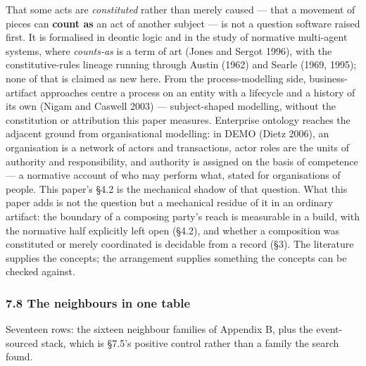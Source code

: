 \documentclass[
]{article}
\newcounter{none} %
\begin{document}
That some acts are \emph{constituted} rather than merely caused --- that
a movement of pieces can \textbf{count as} an act of another subject ---
is not a question software raised first. It is formalised in deontic
logic and in the study of normative multi-agent systems, where
\emph{counts-as} is a term of art (Jones and Sergot 1996), with the
constitutive-rules lineage running through Austin (1962) and Searle
(1969, 1995); none of that is claimed as new here. From the
process-modelling side, business-artifact approaches centre a process on
an entity with a lifecycle and a history of its own (Nigam and Caswell
2003) --- subject-shaped modelling, without the constitution or
attribution this paper measures. Enterprise ontology reaches the
adjacent ground from organisational modelling: in DEMO (Dietz 2006), an
organisation is a network of actors and transactions, actor roles are
the units of authority and responsibility, and authority is assigned on
the basis of competence --- a normative account of who may perform what,
stated for organisations of people. This paper's §4.2 is the mechanical
shadow of that question. What this paper adds is not the question but a
mechanical residue of it in an ordinary artifact: the boundary of a
composing party's reach is measurable in a build, with the normative
half explicitly left open (§4.2), and whether a composition was
constituted or merely coordinated is decidable from a record (§3). The
literature supplies the concepts; the arrangement supplies something the
concepts can be checked against.

\subsubsection{7.8 The neighbours in one
table}\label{the-neighbours-in-one-table}

Seventeen rows: the sixteen neighbour families of Appendix B, plus the
event-sourced stack, which is §7.5's positive control rather than a
family the search found.
\end{document}

